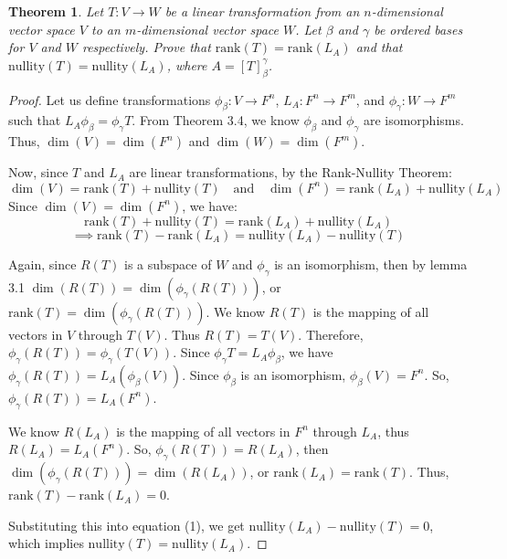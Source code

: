 \documentclass[12pt, a4paper]{article}
\newtheorem{theorem}{Theorem}[section]
\theoremstyle{definition}
\theoremstyle{remark}
\begin{document}
\begin{theorem}
    Let $T: V \to W$ be a linear transformation from an $n$-dimensional vector space $V$ to an $m$-dimensional vector space $W$. Let $\beta$ and $\gamma$ be ordered bases for $V$ and $W$ respectively. Prove that $\text{rank}(T) = \text{rank}(L_A)$ and that $\text{nullity}(T) = \text{nullity}(L_A)$, where $A = [T]_\beta^\gamma$.
\end{theorem}

\begin{proof}
    Let us define transformations $\phi_\beta: V \to F^n$, $L_A: F^n \to F^m$, and $\phi_\gamma: W \to F^m$ such that $L_A \phi_\beta = \phi_\gamma T$. From Theorem 3.4, we know $\phi_\beta$ and $\phi_\gamma$ are isomorphisms. Thus, $\dim(V) = \dim(F^n)$ and $\dim(W) = \dim(F^m)$.

Now, since $T$ and $L_A$ are linear transformations, by the Rank-Nullity Theorem:
\[ \dim(V) = \text{rank}(T) + \text{nullity}(T) \quad \text{and} \quad \dim(F^n) = \text{rank}(L_A) + \text{nullity}(L_A) \]
Since $\dim(V) = \dim(F^n)$, we have:
\[ \text{rank}(T) + \text{nullity}(T) = \text{rank}(L_A) + \text{nullity}(L_A) \]
\[ \implies \text{rank}(T) - \text{rank}(L_A) = \text{nullity}(L_A) - \text{nullity}(T) \tag{1} \]

Again, since $R(T)$ is a subspace of $W$ and $\phi_\gamma$ is an isomorphism, then by lemma 3.1 $\dim(R(T)) = \dim(\phi_\gamma(R(T)))$, or $\text{rank}(T) = \dim(\phi_\gamma(R(T)))$. We know $R(T)$ is the mapping of all vectors in $V$ through $T(V)$. Thus $R(T) = T(V)$. Therefore, $\phi_\gamma(R(T)) = \phi_\gamma(T(V))$. Since $\phi_\gamma T = L_A \phi_\beta$, we have $\phi_\gamma(R(T)) = L_A(\phi_\beta(V))$. Since $\phi_\beta$ is an isomorphism, $\phi_\beta(V) = F^n$. So, $\phi_\gamma(R(T)) = L_A(F^n)$. 

We know $R(L_A)$ is the mapping of all vectors in $F^n$ through $L_A$, thus $R(L_A) = L_A(F^n)$. So, $\phi_\gamma(R(T)) = R(L_A)$, then $\dim(\phi_\gamma(R(T))) = \dim(R(L_A))$, or $\text{rank}(L_A) = \text{rank}(T)$. Thus, $\text{rank}(T) - \text{rank}(L_A) = 0$.

Substituting this into equation (1), we get $\text{nullity}(L_A) - \text{nullity}(T) = 0$, which implies $\text{nullity}(T) = \text{nullity}(L_A)$.
\end{proof}
\end{document}
